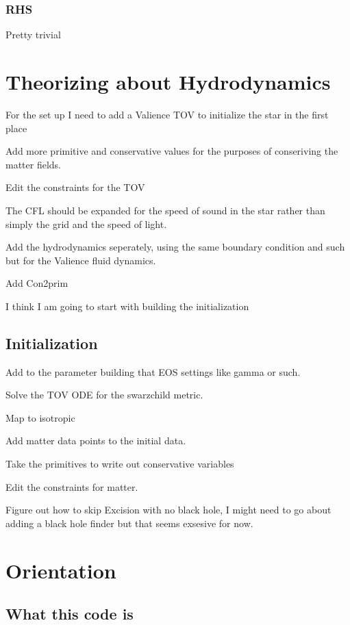 \subsubsection{RHS}

Pretty trivial

\section{Theorizing about Hydrodynamics}

For the set up I need to add a Valience TOV to initialize the star in the first place


Add more primitive and conservative values for the purposes of conseriving the matter fields.

Edit the constraints for the TOV

The CFL should be expanded for the speed of sound in the star rather than simply the grid and the speed of light.

Add the hydrodynamics seperately, using the same boundary condition and such but for the Valience fluid dynamics.

Add Con2prim

I think I am going to start with building the initialization
\subsection{Initialization}

Add to the parameter building that EOS settings like gamma or such.

Solve the TOV ODE for the swarzchild metric.

Map to isotropic

Add matter data points to the initial data.

Take the primitives to write out conservative variables

Edit the constraints for matter.

Figure out how to skip Excision with no black hole, I might need to go about adding a black hole finder but that seems exsesive for now.


\section{Orientation}
\label{ch:orientation}

\subsection{What this code is}

